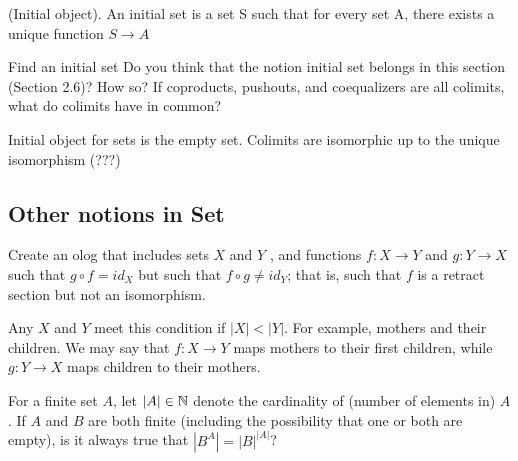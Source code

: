 \documentclass{article}
\begin{document}
\begin{center}
\end{center}



(Initial object). An initial set is a set S such that for every set A, there
exists a unique function $S \to A$

\es Find an initial set
\ei Do you think that the notion initial set belongs in this section (Section
    2.6)? How so? If coproducts, pushouts, and coequalizers are all colimits,
    what do colimits have in common?
\ee

\ans

\es Initial object for sets is the empty set.
\ei Colimits are isomorphic up to the unique isomorphism (???)
\ee

\subsection{Other notions in Set}


Create an olog that includes sets $X$ and $Y$ , and functions $f : X \to Y$ and
$g: Y \to X$ such that $g \circ f = id_X$ but such that $f \circ g \ne id_Y$;
that is, such that $f$ is a retract section but not an isomorphism.

\ans

Any $X$ and $Y$ meet this condition if $|X| < |Y|$. For example, mothers and
their children. We may say that $f:X \to Y$ maps mothers to their first
children, while $g:Y \to X$ maps children to their mothers.


For a finite set $A$, let $|A| \in \mathbb{N}$ denote the cardinality of (number of
elements in) $A$. If $A$ and $B$ are both finite (including the possibility that
one or both are empty), is it always true that $|B^A| = |B|^{|A|}$?
\end{document}
